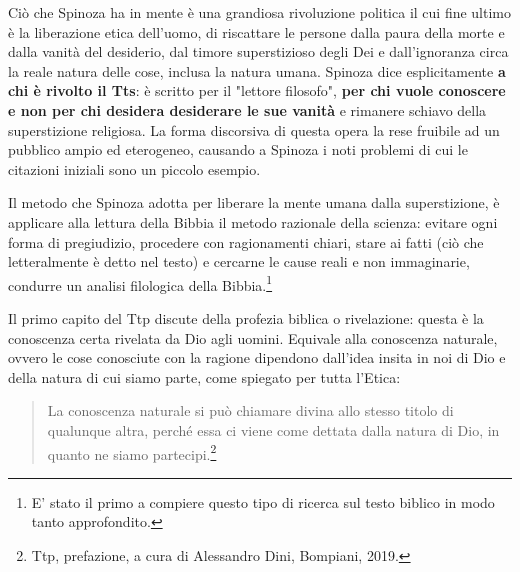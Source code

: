 Ciò che Spinoza ha in mente è
una grandiosa rivoluzione politica il cui fine ultimo è la liberazione etica dell'uomo, di riscattare le persone dalla paura
della morte e dalla vanità del desiderio, dal timore superstizioso degli Dei e dall'ignoranza circa la
reale natura delle cose, inclusa la natura umana. Spinoza dice esplicitamente \textbf{a chi è rivolto il Tts}: è scritto per il "lettore filosofo", \textbf{per chi vuole conoscere e non per chi desidera desiderare le sue vanità} e rimanere schiavo della superstizione religiosa. La forma  discorsiva di questa opera la rese fruibile ad un pubblico ampio ed eterogeneo, causando a Spinoza i noti problemi di cui le citazioni iniziali sono un piccolo esempio.

Il metodo che Spinoza adotta per liberare la mente umana dalla superstizione, è applicare alla lettura della Bibbia il metodo razionale
della scienza: evitare ogni forma di pregiudizio, procedere con ragionamenti chiari, stare ai fatti (ciò che
letteralmente è detto nel testo) e cercarne le cause reali e non immaginarie, condurre un analisi filologica della Bibbia.\footnote{E' stato il primo a compiere questo tipo di ricerca sul testo biblico in modo tanto approfondito.}

Il primo capito del Ttp discute della profezia biblica o rivelazione: questa è la conoscenza certa rivelata da Dio agli uomini. Equivale alla conoscenza naturale, ovvero le cose conosciute con la ragione dipendono dall'idea insita in noi di Dio e della natura di cui siamo parte, come spiegato per tutta l'Etica:

\begin{quotation}
	\small La conoscenza naturale si può
	chiamare divina allo stesso titolo di qualunque altra, perché essa ci viene come dettata dalla natura
	di Dio, in quanto ne siamo partecipi.\footnote{Ttp, prefazione, a cura di Alessandro Dini, Bompiani, 2019.}
\end{quotation}

